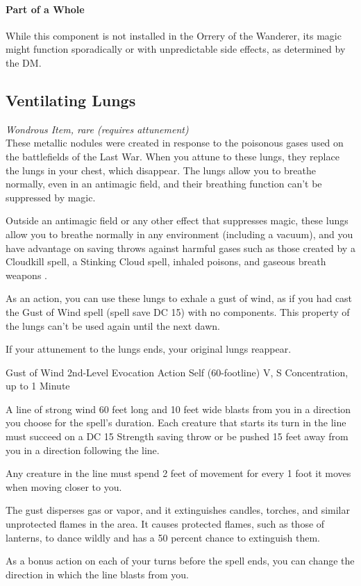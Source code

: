 \documentclass[letterpaper,openany,oneside,twocolumn]{book}
\begin{document}
\paragraph*{Part of a Whole} While this component is not installed in the Orrery of the Wanderer, its magic might function sporadically or with unpredictable side effects, as determined by the DM.
\vfill\eject
\subsection*{Ventilating Lungs}
\textit{Wondrous Item, rare (requires attunement)}\\
These metallic nodules were created in response to the poisonous gases used on the battlefields of the Last War. When you attune to these lungs, they replace the lungs in your chest, which disappear. The lungs allow you to breathe normally, even in an antimagic field, and their breathing function can't be suppressed by magic.

Outside an antimagic field or any other effect that suppresses magic, these lungs allow you to breathe normally in any environment (including a vacuum), and you have advantage on saving throws against harmful gases such as those created by a Cloudkill spell, a Stinking Cloud spell, inhaled poisons, and gaseous breath weapons .

As an action, you can use these lungs to exhale a gust of wind, as if you had cast the Gust of Wind spell (spell save DC 15) with no components. This property of the lungs can't be used again until the next dawn.

If your attunement to the lungs ends, your original lungs reappear.

\DndSpellHeader
  {Gust of Wind}
  {2nd-Level Evocation}
  {Action}
  {Self (60-footline)}
  {V, S}
  {Concentration, up to 1 Minute}

A line of strong wind 60 feet long and 10 feet wide blasts from you in a direction you choose for the spell's duration. Each creature that starts its turn in the line must succeed on a DC 15 Strength saving throw or be pushed 15 feet away from you in a direction following the line.

Any creature in the line must spend 2 feet of movement for every 1 foot it moves when moving closer to you.

The gust disperses gas or vapor, and it extinguishes candles, torches, and similar unprotected flames in the area. It causes protected flames, such as those of lanterns, to dance wildly and has a 50 percent chance to extinguish them.

As a bonus action on each of your turns before the spell ends, you can change the direction in which the line blasts from you.
\end{document}
